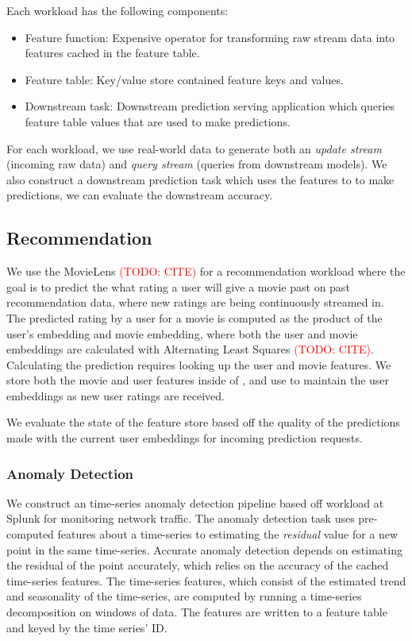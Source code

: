 Each workload has the following components: 
\begin{itemize}
    \item Feature function: Expensive operator for transforming raw stream data into features cached in the feature table. 
    \item Feature table: Key/value store contained feature keys and values.
    \item Downstream task: Downstream prediction serving application which queries feature table values that are used to make predictions. 
\end{itemize}
For each workload, we use real-world data to generate both an \textit{update stream} (incoming raw data) and \textit{query stream} (queries from downstream models). We also construct a downstream prediction task which uses the features to to make predictions, we can evaluate the downstream accuracy. 

\subsection{Recommendation}
We use the MovieLens \textcolor{red}{(TODO: CITE)} for a recommendation workload where the goal is to predict the what rating a user will give a movie past on past recommendation data, where new ratings are being continuously streamed in. The predicted rating by a user for a movie is computed as the product of the user's embedding and movie embedding, where both the user and movie embeddings are calculated with Alternating Least Squares \textcolor{red}{(TODO: CITE)}. Calculating the prediction requires looking up the user and movie features. We store both the movie and user features inside of \system{}, and use \system{} to maintain the user embeddings as new user ratings are received.  


We evaluate the state of the feature store based off the quality of the predictions made with the current user embeddings for incoming prediction requests. 

\subsubsection{Anomaly Detection}
We construct an time-series anomaly detection pipeline based off workload at Splunk for monitoring network traffic. The anomaly detection task uses pre-computed features about a time-series to estimating the \textit{residual} value for a new point in the same time-series. Accurate anomaly detection depends on estimating the residual of the point accurately, which relies on the accuracy of the cached time-series features. The time-series features, which consist of the estimated trend and seasonality of the time-series, are computed by running a time-series decomposition on windows of data. The features are written to a feature table and keyed by the time series' ID. 

